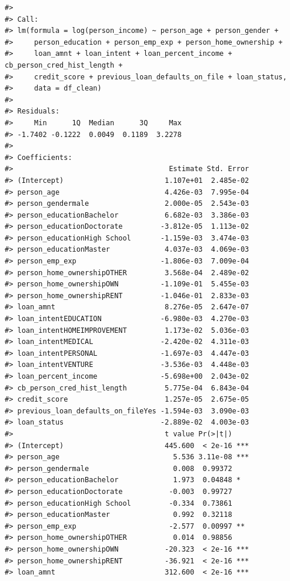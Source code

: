 \documentclass[
  10pt,
]{article}
\begin{document}
\begin{verbatim}
#> 
#> Call:
#> lm(formula = log(person_income) ~ person_age + person_gender + 
#>     person_education + person_emp_exp + person_home_ownership + 
#>     loan_amnt + loan_intent + loan_percent_income + cb_person_cred_hist_length + 
#>     credit_score + previous_loan_defaults_on_file + loan_status, 
#>     data = df_clean)
#> 
#> Residuals:
#>     Min      1Q  Median      3Q     Max 
#> -1.7402 -0.1222  0.0049  0.1189  3.2278 
#> 
#> Coefficients:
#>                                     Estimate Std. Error
#> (Intercept)                        1.107e+01  2.485e-02
#> person_age                         4.426e-03  7.995e-04
#> person_gendermale                  2.000e-05  2.543e-03
#> person_educationBachelor           6.682e-03  3.386e-03
#> person_educationDoctorate         -3.812e-05  1.113e-02
#> person_educationHigh School       -1.159e-03  3.474e-03
#> person_educationMaster             4.037e-03  4.069e-03
#> person_emp_exp                    -1.806e-03  7.009e-04
#> person_home_ownershipOTHER         3.568e-04  2.489e-02
#> person_home_ownershipOWN          -1.109e-01  5.455e-03
#> person_home_ownershipRENT         -1.046e-01  2.833e-03
#> loan_amnt                          8.276e-05  2.647e-07
#> loan_intentEDUCATION              -6.980e-03  4.270e-03
#> loan_intentHOMEIMPROVEMENT         1.173e-02  5.036e-03
#> loan_intentMEDICAL                -2.420e-02  4.311e-03
#> loan_intentPERSONAL               -1.697e-03  4.447e-03
#> loan_intentVENTURE                -3.536e-03  4.448e-03
#> loan_percent_income               -5.698e+00  2.043e-02
#> cb_person_cred_hist_length         5.775e-04  6.843e-04
#> credit_score                       1.257e-05  2.675e-05
#> previous_loan_defaults_on_fileYes -1.594e-03  3.090e-03
#> loan_status                       -2.889e-02  4.003e-03
#>                                    t value Pr(>|t|)    
#> (Intercept)                        445.600  < 2e-16 ***
#> person_age                           5.536 3.11e-08 ***
#> person_gendermale                    0.008  0.99372    
#> person_educationBachelor             1.973  0.04848 *  
#> person_educationDoctorate           -0.003  0.99727    
#> person_educationHigh School         -0.334  0.73861    
#> person_educationMaster               0.992  0.32118    
#> person_emp_exp                      -2.577  0.00997 ** 
#> person_home_ownershipOTHER           0.014  0.98856    
#> person_home_ownershipOWN           -20.323  < 2e-16 ***
#> person_home_ownershipRENT          -36.921  < 2e-16 ***
#> loan_amnt                          312.600  < 2e-16 ***

\end{verbatim}
\end{document}
